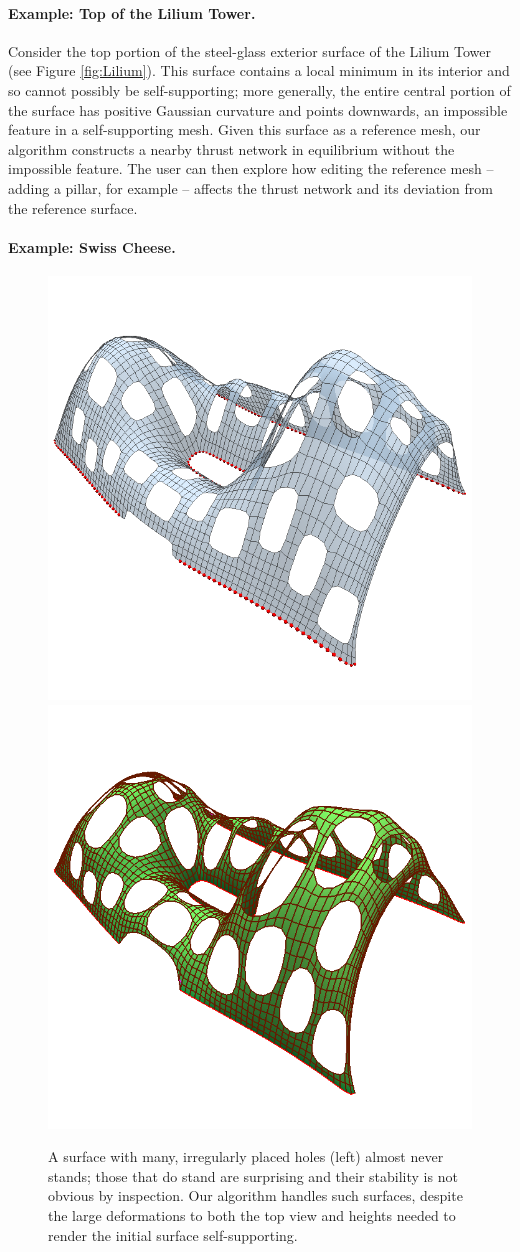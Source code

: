 \documentclass[annual]{acmsiggraph}
\begin{document}
\paragraph{Example: Top of the Lilium Tower.}

Consider the top portion of the steel-glass exterior surface of the Lilium 
Tower (see Figure \ref{fig:Lilium}). This surface contains a local minimum 
in its interior and so cannot possibly be self-supporting; more generally, 
the entire central portion of the surface has positive Gaussian curvature 
and points downwards, an impossible feature in a self-supporting mesh. 
Given this surface as a reference mesh, our algorithm constructs a nearby 
thrust network in equilibrium without the impossible feature. The user can 
then explore how editing the reference mesh -- adding a pillar, for 
example -- affects the thrust network and its deviation from the reference 
surface.

\paragraph{Example: Swiss Cheese.}

\begin{figure}[htb]
\centering
\includegraphics[width=0.4\columnwidth]{fig/cheese}
\hfill
\includegraphics[width=0.4\columnwidth]{fig/cheese-n}
\caption{A surface with many, irregularly placed holes (left) almost never stands; those that do stand
are surprising and their stability is not obvious by inspection. Our algorithm handles such surfaces,
despite the large deformations to both the top view and heights needed to render the initial surface
self-supporting.}
\label{fig:cheese}
\end{figure}
\end{document}
